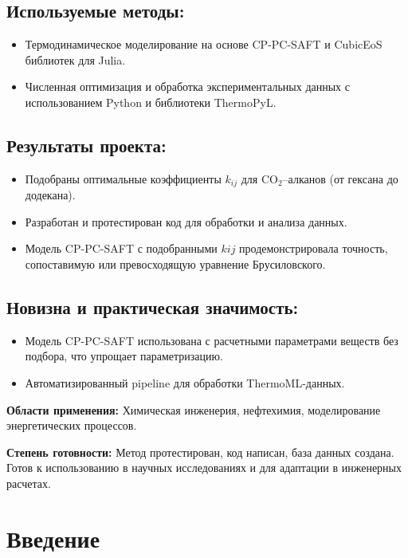 \documentclass[a4paper,12pt]{article}
\begin{document}
\subsection*{Используемые методы:}
\begin{itemize}
\item Термодинамическое моделирование на основе CP-PC-SAFT и CubicEoS библиотек для Julia.
\item Численная оптимизация и обработка экспериментальных данных с использованием Python и библиотеки ThermoPyL.
\end{itemize}

\subsection*{Результаты проекта:}
\begin{itemize}
\item Подобраны оптимальные коэффициенты $k_{ij}$ для $\mathrm{CO}_{2}$–алканов (от гексана до додекана).
\item Разработан и протестирован код для обработки и анализа данных.
\item Модель CP-PC-SAFT с подобранными $k{ij}$ продемонстрировала точность, сопоставимую или превосходящую уравнение Брусиловского.
\end{itemize}

\subsection*{Новизна и практическая значимость:}
\begin{itemize}
\item Модель CP-PC-SAFT использована с расчетными параметрами веществ без подбора, что упрощает параметризацию.
\item Автоматизированный pipeline для обработки ThermoML-данных.
\end{itemize}

\textbf{Области применения:} Химическая инженерия, нефтехимия, моделирование энергетических процессов.

\textbf{Степень готовности:} Метод протестирован, код написан, база данных создана. Готов к использованию в научных исследованиях и для адаптации в инженерных расчетах.

\tableofcontents
\newpage
\section{Введение}
\end{document}
